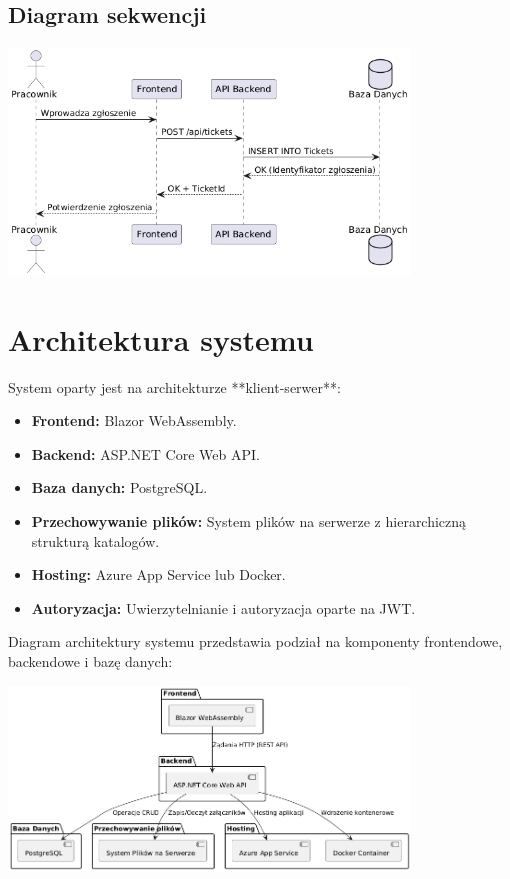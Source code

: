 \documentclass[a4paper,12pt]{article}
\begin{document}
\subsection{Diagram sekwencji}
\begin{center}
\includegraphics[width=0.8\textwidth]{draw/diagramSekwencji.png}
\end{center}

\newpage

\section{Architektura systemu}
System oparty jest na architekturze **klient-serwer**:
\begin{itemize}
    \item \textbf{Frontend:} Blazor WebAssembly.
    \item \textbf{Backend:} ASP.NET Core Web API.
    \item \textbf{Baza danych:} PostgreSQL.
    \item \textbf{Przechowywanie plików:} System plików na serwerze z hierarchiczną strukturą katalogów.
    \item \textbf{Hosting:} Azure App Service lub Docker.
    \item \textbf{Autoryzacja:} Uwierzytelnianie i autoryzacja oparte na JWT.
\end{itemize}

Diagram architektury systemu przedstawia podział na komponenty frontendowe, backendowe i bazę danych:

\begin{center}
\includegraphics[width=0.8\textwidth]{draw/diagramArchitektury.png}
\end{center}
\end{document}

